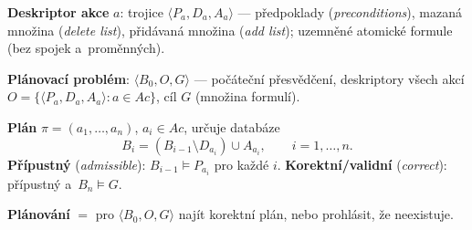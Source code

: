 \documentclass[11pt,a4paper]{article}
\theoremstyle{definition}
\begin{document}
\begin{defbox}
\textbf{Deskriptor akce} $a$: trojice $\langle P_a, D_a, A_a\rangle$ ---
předpoklady (\emph{preconditions}), mazaná množina (\emph{delete list}), přidávaná množina
(\emph{add list}); uzemněné atomické formule (bez spojek a~proměnných).

\textbf{Plánovací problém}: $\langle B_0, O, G\rangle$ --- počáteční přesvědčení, deskriptory
všech akcí $O = \{\langle P_a,D_a,A_a\rangle : a \in \mathit{Ac}\}$, cíl $G$ (množina formulí).

\textbf{Plán} $\pi = (a_1,\dots,a_n)$, $a_i \in \mathit{Ac}$, určuje databáze
\[
B_i = (B_{i-1} \setminus D_{a_i}) \cup A_{a_i}, \qquad i = 1,\dots,n .
\]
\textbf{Přípustný} (\emph{admissible}): $B_{i-1} \models P_{a_i}$ pro každé $i$.
\textbf{Korektní/validní} (\emph{correct}): přípustný a~$B_n \models G$.

\textbf{Plánování} $=$ pro $\langle B_0,O,G\rangle$ najít korektní plán, nebo prohlásit, že neexistuje.
\end{defbox}
\end{document}
